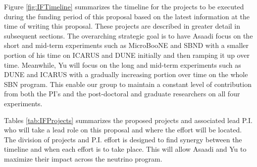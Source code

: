 Figure \ref{fig:IFTimeline} summarizes the timeline for the projects to be executed during the funding period of this proposal based on the latest information at the time of writing this proposal. These projects are described in greater detail in subsequent sections. The overarching strategic goal is to have Asaadi focus on the short and mid-term experiments such as MicroBooNE and SBND with a smaller portion of his time on ICARUS and DUNE initially and then ramping it up over time. Meanwhile, Yu will focus on the long and mid-term experiments such as DUNE and ICARUS with a gradually increasing portion over time on the whole SBN program. This enable our group to maintain a constant level of contribution from both the PI's and the post-doctoral and graduate researchers on all four experiments.

Tables \ref{tab:IFProjects} summarizes the proposed projects and associated lead P.I. who will take a lead role on this proposal and where the effort will be located. The division of projects and P.I. effort is designed to find synergy between the timeline and when each effort is to take place. This will allow Asaadi and Yu to maximize their impact across the neutrino program. 

